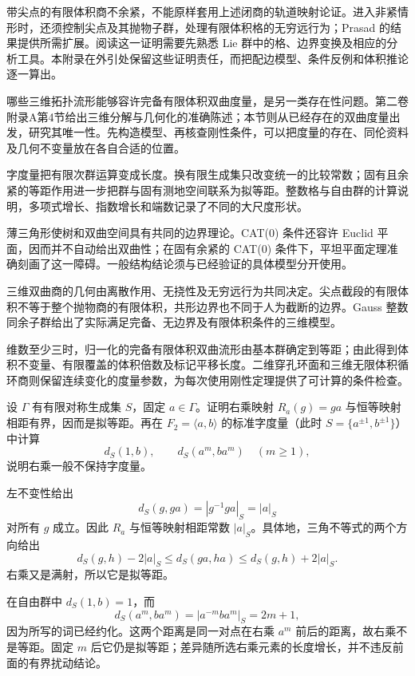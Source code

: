 \ProseParagraphBreak
带尖点的有限体积商不余紧，不能原样套用上述闭商的轨道映射论证。进入非紧情形时，还须控制尖点及其抛物子群，处理有限体积格的无穷远行为；Prasad 的结果提供所需扩展。阅读这一证明需要先熟悉 Lie 群中的格、边界变换及相应的分析工具。本附录在外引处保留这些证明责任，而把配边模型、条件反例和体积推论逐一算出。

\ProseParagraphBreak
哪些三维拓扑流形能够容许完备有限体积双曲度量，是另一类存在性问题。第二卷附录A第4节给出三维分解与几何化的准确陈述；本节则从已经存在的双曲度量出发，研究其唯一性。先构造模型、再核查刚性条件，可以把度量的存在、同伦资料及几何不变量放在各自合适的位置。

\begin{chaptersummary}
	字度量把有限次群运算变成长度。换有限生成集只改变统一的比较常数；固有且余紧的等距作用进一步把群与固有测地空间联系为拟等距。整数格与自由群的计算说明，多项式增长、指数增长和端数记录了不同的大尺度形状。

	\ProseParagraphBreak
	薄三角形使树和双曲空间具有共同的边界理论。CAT(0) 条件还容许 Euclid 平面，因而并不自动给出双曲性；在固有余紧的 CAT(0) 条件下，平坦平面定理准确刻画了这一障碍。一般结构结论须与已经验证的具体模型分开使用。

	\ProseParagraphBreak
	三维双曲商的几何由离散作用、无挠性及无穷远行为共同决定。尖点截段的有限体积不等于整个抛物商的有限体积，共形边界也不同于人为截断的边界。Gauss 整数同余子群给出了实际满足完备、无边界及有限体积条件的三维模型。

	\ProseParagraphBreak
	维数至少三时，归一化的完备有限体积双曲流形由基本群确定到等距；由此得到体积不变量、有限覆盖的体积倍数及标记平移长度。二维穿孔环面和三维无限体积循环商则保留连续变化的度量参数，为每次使用刚性定理提供了可计算的条件检查。
\end{chaptersummary}

\BookExercises

\begin{exercise}\label{g3:ex:D-right-translation}
	设 \(\Gamma\) 有有限对称生成集 \(S\)，固定 \(a\in\Gamma\)。证明右乘映射 \(R_a(g)=ga\) 与恒等映射相距有界，因而是拟等距。再在 \(F_2=\langle a,b\rangle\) 的标准字度量（此时 \(S=\{a^{\pm1},b^{\pm1}\}\)）中计算
	\[
		d_S(1,b),\qquad d_S(a^m,ba^m)\quad(m\ge1),
	\]
	说明右乘一般不保持字度量。
\end{exercise}
\begin{solution}
	左不变性给出
	\[
		d_S(g,ga)=|g^{-1}ga|_S=|a|_S
	\]
	对所有 \(g\) 成立。因此 \(R_a\) 与恒等映射相距常数 \(|a|_S\)。具体地，三角不等式的两个方向给出
	\[
		d_S(g,h)-2|a|_S
		\le d_S(ga,ha)
		\le d_S(g,h)+2|a|_S.
	\]
	右乘又是满射，所以它是拟等距。

	在自由群中 \(d_S(1,b)=1\)，而
	\[
		d_S(a^m,ba^m)=|a^{-m}ba^m|_S=2m+1,
	\]
	因为所写的词已经约化。这两个距离是同一对点在右乘 \(a^m\) 前后的距离，故右乘不是等距。固定 \(m\) 后它仍是拟等距；差异随所选右乘元素的长度增长，并不违反前面的有界扰动结论。
\end{solution}

